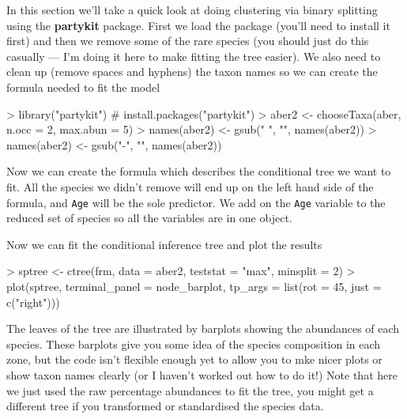 \documentclass[a4paper,10pt]{article}
\begin{document}
In this section we'll take a quick look at doing clustering via binary splitting using the \textbf{partykit} package. First we load the package (you'll need to install it first) and then we remove some of the rare species (you should just do this casually --- I'm doing it here to make fitting the tree easier). We also need to clean up (remove spaces and hyphens) the taxon names so we can create the formula needed to fit the model

\begin{Schunk}
\begin{Sinput}
> library("partykit")                     # install.packages("partykit")
> aber2 <- chooseTaxa(aber, n.occ = 2, max.abun = 5)
> names(aber2) <- gsub(" ", "", names(aber2))
> names(aber2) <- gsub("-", "", names(aber2))
\end{Sinput}
\end{Schunk}

Now we can create the formula which describes the conditional tree we want to fit. All the species we didn't remove will end up on the left hand side of the formula, and \texttt{Age} will be the sole predictor. We add on the \texttt{Age} variable to the reduced set of species so all the variables are in one object.

\begin{Schunk}
\end{Schunk}

Now we can fit the conditional inference tree and plot the results

\begin{Schunk}
\begin{Sinput}
> sptree <- ctree(frm, data = aber2, teststat = "max", minsplit = 2)
> plot(sptree, terminal_panel = node_barplot, tp_args = list(rot = 45, just = c("right")))
\end{Sinput}
\end{Schunk}

The leaves of the tree are illustrated by barplots showing the abundances of each species. These barplots give you some idea of the species composition in each zone, but the code isn't flexible enough yet to allow you to mke nicer plots or show taxon names clearly (or I haven't worked out how to do it!) Note that here we just used the raw percentage abundances to fit the tree, you might get a different tree if you transformed or standardised the species data.
\end{document}
